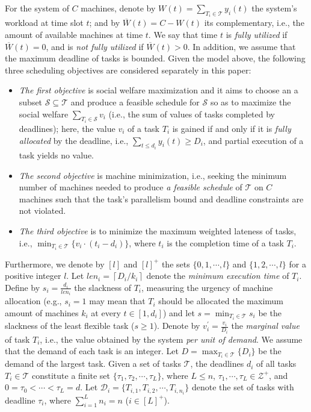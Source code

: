 \documentclass[10pt,journal,compsoc]{IEEEtran}
\begin{document}
For the system of $C$ machines, denote by $W(t)=\sum_{T_{i}\in\mathcal{T}}{y_{i}(t)}$ the system's workload at time slot $t$; and by $\overline{W}(t)=C-W(t)$ its complementary, i.e., the amount of available machines at time $t$. We say that time $t$ is {\em fully utilized} if $\overline{W}(t)=0$, and is {\em not fully utilized} if $\overline{W}(t)>0$. In addition, we assume that the maximum deadline of tasks is bounded. Given the model above, the following three scheduling objectives are considered separately in this paper:
\begin{itemize}
  \setlength\itemsep{0.17em}
\item \textit{The first objective} is social welfare maximization and it aims to choose an a subset $\mathcal{S}\subseteq\mathcal{T}$ and produce a feasible schedule for $\mathcal{S}$ so as to maximize the social welfare $\sum_{T_{i}\in \mathcal{S}}{v_{i}}$ (i.e., the sum of values of tasks completed by deadlines); here, the value $v_i$ of a task $T_{i}$ is gained if and only if it is {\em fully allocated} by the deadline, i.e., $\sum_{t\leq d_{i}}{y_{i}(t)} \geq D_{i}$, and partial execution of a task yields no value.
\item \textit{The second objective} is machine minimization, i.e., seeking the minimum number of machines needed to produce {\em a feasible schedule} of $\mathcal{T}$ on $C$ machines such that the task's parallelism bound and deadline constraints are not violated.
\item \textit{The third objective} is to minimize the maximum weighted lateness of tasks, i.e., $\min_{T_{i}\in\mathcal{T}}\{v_{i}\cdot(t_{i}-d_{i})\}$, where $t_{i}$ is the completion time of a task $T_{i}$.
\end{itemize}
Furthermore, we denote by $[l]$ and $[l]^{+}$ the sets $\{0, 1, \cdots, l\}$ and $\{1, 2, \cdots, l\}$ for a positive integer $l$. Let $len_{i} = \left\lceil D_i/k_i \right\rceil$ denote the {\em minimum execution time} of $T_{i}$. Define by $s_{i}= \frac{d_{i}}{len_{i}}$ the slackness of $T_{i}$, measuring the urgency of machine allocation (e.g., $s_{i}=1$ may mean that $T_{i}$ should be allocated the maximum amount of machines $k_{i}$ at every $t\in [1, d_{i}]$) and let $s=\min_{T_{i}\in\mathcal{T}}{s_{i}}$ be the slackness of the least flexible task ($s\ge 1$). Denote by $v_{i}^{\prime}=\frac{v_{i}}{D_{i}}$ the {\em marginal value} of task $T_{i}$, i.e., the value obtained by the system {\em per unit of demand}. We assume that the demand of each task is an integer. Let $D=\max_{T_{i}\in\mathcal{T}}\{D_{i}\}$ be the demand of the largest task. Given a set of tasks $\mathcal{T}$, the deadlines $d_{i}$ of all tasks $T_{i}\in\mathcal{T}$ constitute a finite set $\{\tau_{1}, \tau_{2}, \cdots, \tau_{L}\}$, where $L\leq n$, $\tau_{1},\cdots,\tau_{L}\in\mathcal{Z}^{+}$, and $0=\tau_{0} < \cdots < \tau_{L}=d$. Let $\mathcal{D}_{i}=\{T_{i,1}, T_{i,2}, \cdots, T_{i,n_{i}} \}$ denote the set of tasks with deadline $\tau_{i}$, where $\sum_{i=1}^{L}{n_{i}}=n$ ($i\in[L]^{+}$).
\end{document}
